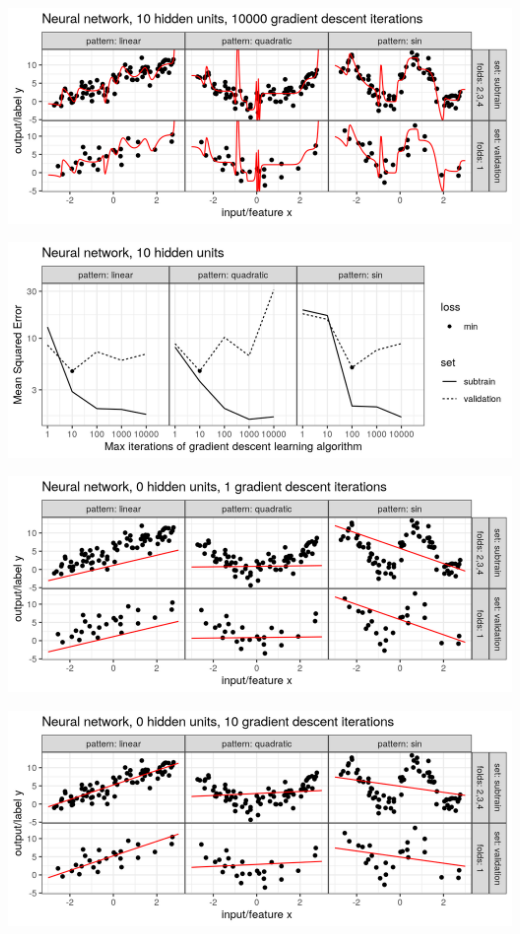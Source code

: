 \begin{frame}
  \includegraphics[width=\textwidth]{figure-overfitting-pred-units=10-maxit=10000.png}
\end{frame}


\begin{frame}
  \includegraphics[width=\textwidth]{figure-overfitting-data-loss-10.png}
\end{frame}


\begin{frame}
  \includegraphics[width=\textwidth]{figure-overfitting-pred-units=0-maxit=1.png}
\end{frame}


\begin{frame}
  \includegraphics[width=\textwidth]{figure-overfitting-pred-units=0-maxit=10.png}
\end{frame}


